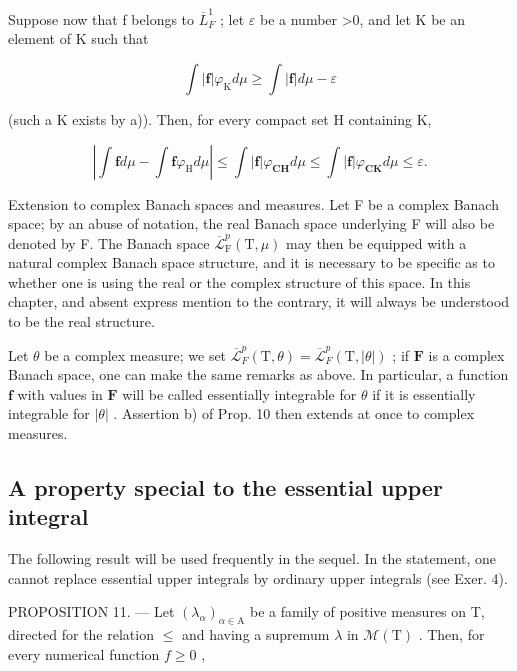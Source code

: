 Suppose now that f belongs to \(\overline{L}_{F}^{1}\) ; let \(\varepsilon\) be a number \textgreater0, and let K be an element of K such that

\[
\int | \mathbf {f} | \varphi_ {\mathrm{K}} d \mu \geqslant \int | \mathbf {f} | d \mu - \varepsilon
\]

(such a K exists by a)). Then, for every compact set H containing K,

\[
\left| \int \mathbf {f} d \mu - \int \mathbf {f} \varphi_ {\mathrm{H}} d \mu \right| \leqslant \int | \mathbf {f} | \varphi_ {\mathbf {C H}} d \mu \leqslant \int | \mathbf {f} | \varphi_ {\mathbf {C K}} d \mu \leqslant \varepsilon .
\]

Extension to complex Banach spaces and measures. Let F be a complex Banach space; by an abuse of notation, the real Banach space underlying F will also be denoted by F. The Banach space \(\overline{\mathcal{L}}_{\mathrm{F}}^{p}(\mathrm{T},\mu)\) may then be equipped with a natural complex Banach space structure, and it is necessary to be specific as to whether one is using the real or the complex structure of this space. In this chapter, and absent express mention to the contrary, it will always be understood to be the real structure.

Let \(\theta\) be a complex measure; we set \(\overline{\mathcal{L}}_F^p (\mathrm{T},\theta) = \overline{\mathcal{L}}_F^p (\mathrm{T},|\theta |)\) ; if \(\mathbf{F}\) is a complex Banach space, one can make the same remarks as above. In particular, a function \(\mathbf{f}\) with values in \(\mathbf{F}\) will be called essentially integrable for \(\theta\) if it is essentially integrable for \(|\theta |\) . Assertion b) of Prop. 10 then extends at once to complex measures.

\subsection{A property special to the essential upper integral}

The following result will be used frequently in the sequel. In the statement, one cannot replace essential upper integrals by ordinary upper integrals (see Exer. 4).

PROPOSITION 11. --- Let \((\lambda_{\alpha})_{\alpha\in\mathrm{A}}\) be a family of positive measures on T, directed for the relation \(\leqslant\) and having a supremum \(\lambda\) in \(\mathcal{M}(\mathrm{T})\) . Then, for every numerical function \(f\geqslant0\) ,

